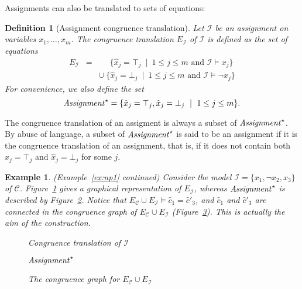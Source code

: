 \documentclass{easychair}
\newtheorem{example}{Example}
\newtheorem{definition}{Definition}
\begin{document}
Assignments can also be translated to sets of equations:
\begin{definition}[Assignment congruence translation]
Let $\mathcal{I}$ be an assignment on variables $x_1,\ldots,x_m$.
The congruence translation $E_{\mathcal{I}}$ of $\mathcal{I}$ is defined as the set of equations
\begin{eqnarray*}
  E_{\mathcal{I}} & = & \phantom{\cup}\ \{ \hat{x}_j = \top_j \ \mid\  1 \leq j \leq m \text{ and } \mathcal{I} \models x_j \} \\
               &   & \cup\ \{ \hat{x}_j = \bot_j \ \mid\ 1 \leq j \leq m \text{ and } \mathcal{I} \models \neg x_j \}
\end{eqnarray*}
For convenience, we also define the set
\begin{equation*}
  {\it Assignment}^\star = \{ \hat{x}_j = \top_j, \hat{x}_j = \bot_j \ \mid\ 1 \leq j \leq m\}.
\end{equation*}
\end{definition}
\noindent
The congruence translation of an assigment is always a subset of
${\it Assignment}^\star$.  By abuse of language, a subset of ${\it Assignment}^\star$ is
said to be an assignment if it is the congruence translation of an assignment,
that is, if it does not contain both $\hat{x}_j = \top_j$ and $\hat{x}_j =
\bot_j$ for some $j$.

\begin{example}\label{ex:np2} (Example~\ref{ex:np1} continued)  
Consider the model $\mathcal{I} = \{x_1, \neg x_2, x_3\}$ of\/ $\mathcal{C}$.
Figure~\ref{fig:npassignment} gives a graphical representation of
$E_{\mathcal{I}}$, whereas ${\it Assignment}^\star$ is described by
Figure~\ref{fig:npassignmentstar}.  Notice that
$E_{\mathcal{C}} \cup E_{\mathcal{I}} \models \hat{c}_1 = \hat{c}'_3$,
and $\hat{c}_1$ and $\hat{c}'_3$ are connected in the congruence graph
of $E_{\mathcal{C}} \cup E_{\mathcal{I}}$ (Figure~\ref{fig:npmodel}).
This is actually the aim of the construction.

\begin{figure}[ht]

\caption{Congruence translation of $\mathcal{I}$}
\label{fig:npassignment}
\end{figure}

\begin{figure}[ht]

\caption{${\it Assignment}^\star$}
\label{fig:npassignmentstar}
\end{figure}
\begin{figure}[ht]

\caption{The congruence graph for $E_{\mathcal{C}} \cup E_{\mathcal{I}}$}
\label{fig:npmodel}
\end{figure}
\end{example}
\end{document}
